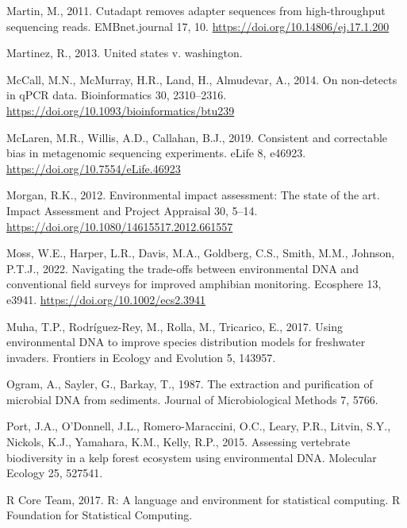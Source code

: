 \documentclass[
]{article}
\newlength{\cslhangindent}
\newlength{\cslentryspacingunit} %
\newenvironment{CSLReferences}[2] %
 {%
  \setlength{\parindent}{0pt}
  \ifodd #1
  \let\oldpar\par
  \def\par{\hangindent=\cslhangindent\oldpar}
  \fi
  \setlength{\parskip}{#2\cslentryspacingunit}
 }%
 {}
\begin{document}
\begin{CSLReferences}{1}{0}
\leavevmode{}%
Martin, M., 2011. Cutadapt removes adapter sequences from
high-throughput sequencing reads. EMBnet.journal 17, 10.
\url{https://doi.org/10.14806/ej.17.1.200}

\leavevmode{}%
Martinez, R., 2013. United states v. washington.

\leavevmode{}%
McCall, M.N., McMurray, H.R., Land, H., Almudevar, A., 2014. On
non-detects in qPCR data. Bioinformatics 30, 2310--2316.
\url{https://doi.org/10.1093/bioinformatics/btu239}

\leavevmode{}%
McLaren, M.R., Willis, A.D., Callahan, B.J., 2019. Consistent and
correctable bias in metagenomic sequencing experiments. eLife 8, e46923.
\url{https://doi.org/10.7554/eLife.46923}

\leavevmode{}%
Morgan, R.K., 2012. Environmental impact assessment: The state of the
art. Impact Assessment and Project Appraisal 30, 5--14.
\url{https://doi.org/10.1080/14615517.2012.661557}

\leavevmode{}%
Moss, W.E., Harper, L.R., Davis, M.A., Goldberg, C.S., Smith, M.M.,
Johnson, P.T.J., 2022. Navigating the trade-offs between environmental
DNA and conventional field surveys for improved amphibian monitoring.
Ecosphere 13, e3941. \url{https://doi.org/10.1002/ecs2.3941}

\leavevmode{}%
Muha, T.P., Rodríguez-Rey, M., Rolla, M., Tricarico, E., 2017. Using
environmental DNA to improve species distribution models for freshwater
invaders. Frontiers in Ecology and Evolution 5, 143957.

\leavevmode{}%
Ogram, A., Sayler, G., Barkay, T., 1987. The extraction and purification
of microbial DNA from sediments. Journal of Microbiological Methods 7,
5766.

\leavevmode{}%
Port, J.A., O'Donnell, J.L., Romero-Maraccini, O.C., Leary, P.R.,
Litvin, S.Y., Nickols, K.J., Yamahara, K.M., Kelly, R.P., 2015.
Assessing vertebrate biodiversity in a kelp forest ecosystem using
environmental DNA. Molecular Ecology 25, 527541.

\leavevmode{}%
R Core Team, 2017. R: A language and environment for statistical
computing. R Foundation for Statistical Computing.


\end{CSLReferences}
\end{document}
